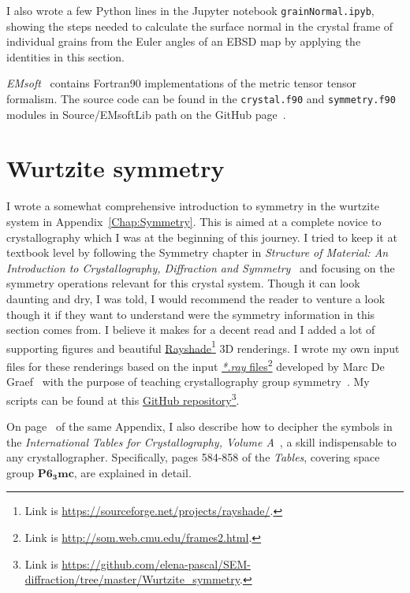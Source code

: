 I also wrote a few Python lines in the Jupyter notebook \texttt{grainNormal.ipyb}, showing the steps needed to calculate the surface normal in the crystal frame of individual grains from the Euler angles of an EBSD map by applying the identities in this section. 
 
\emph{EMsoft}~\cite{EMsoftpaper} contains Fortran90 implementations of the metric tensor tensor formalism. The source code can be found in the \texttt{crystal.f90} and \texttt{symmetry.f90} modules in Source/EMsoftLib path on the GitHub page~\cite{EMsoft}.

\pagebreak

\section{Wurtzite symmetry}
\label{sec:Wsymmetry}
I wrote a somewhat comprehensive introduction to symmetry in the wurtzite system in Appendix~\ref{Chap:Symmetry}. This is aimed at a complete novice to crystallography which I was at the beginning of this journey. I tried to keep it at textbook level by following the Symmetry chapter in \textit{Structure of Material: An Introduction to Crystallography, Diffraction and Symmetry}~\cite{SoM} and focusing on the symmetry operations relevant for this crystal system. Though it can look daunting and dry, I was told, I would recommend the reader to venture a look though it if they want to understand were the symmetry information in this section comes from. I believe it makes for a decent read and I added a lot of supporting figures and beautiful  \href{https://sourceforge.net/projects/rayshade/}{Rayshade}\footnote{ Link is \href{https://sourceforge.net/projects/rayshade/}{https://sourceforge.net/projects/rayshade/}.} 3D renderings. I wrote my own input files for these renderings based on the input  \href{http://som.web.cmu.edu/frames2.html}{\emph{*.ray} files}\footnote{ Link is \href{http://som.web.cmu.edu/frames2.html.}{http://som.web.cmu.edu/frames2.html}.} developed by Marc De Graef~\cite{DeGraef98} with the purpose of teaching crystallography group symmetry~\cite{teachingPointGroup}. My scripts can be found at this \href{https://github.com/elena-pascal/SEM-diffraction/tree/master/Wurtzite_symmetry/}{GitHub repository}\footnote{ Link is \href{https://github.com/elena-pascal/SEM-diffraction/tree/master/Wurtzite_symmetry}{https://github.com/elena-pascal/SEM-diffraction/tree/master/Wurtzite\_symmetry}.}. 

On page~\pageref{chap:int} of the same Appendix, I also describe how to decipher the symbols in the \textit{ International Tables for Crystallography, Volume A}~\cite{IntTableCrysA}, a skill indispensable to any crystallographer. Specifically, pages 584-858 of the \textit{Tables}, covering space group $\mathbf{P6_3mc}$, are explained in detail.

